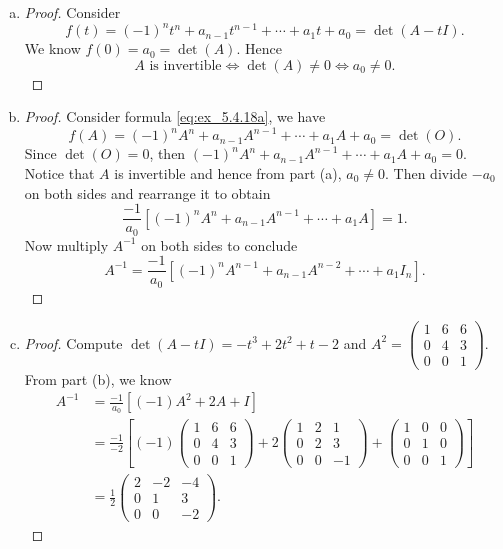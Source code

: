 \begin{Exercise}
	\begin{enumerate}[(a)]
		\item
		\begin{proof}
			Consider
			\begin{equation}\label{eq:ex_5.4.18a}
			f(t) = (-1)^n t^n + a_{n-1} t^{n-1} + \cdots + a_1 t + a_0 = \det(A-t I).
			\end{equation}
			We know $f(0) = a_0 = \det(A)$. Hence
			$$
			A\text{ is invertible} \iff \det(A)\neq 0 \iff a_0 \neq 0.
			$$
		\end{proof}
		
		\item
		\begin{proof}
			Consider formula \eqref{eq:ex_5.4.18a}, we have
			$$
			f(A) = (-1)^n A^n + a_{n-1} A^{n-1} + \cdots + a_1 A + a_0 = \det(O).
			$$
			Since $\det(O) = 0$, then $(-1)^n A^n + a_{n-1} A^{n-1} + \cdots + a_1 A + a_0 = 0$. Notice that $A$ is invertible and hence from part (a), $a_0\neq 0$. Then divide $-a_0$ on both sides and rearrange it to obtain
			$$
			\frac{-1}{a_0}\left[ (-1)^n A^n + a_{n-1} A^{n-1} + \cdots + a_1 A \right] = 1.
			$$
			Now multiply $A^{-1}$ on both sides to conclude
			$$
			A^{-1} = \frac{-1}{a_0}\left[ (-1)^n A^{n-1} + a_{n-1} A^{n-2} + \cdots + a_1 I_n \right].
			$$
		\end{proof}
		
		\item
		\begin{proof}
			Compute $\det(A-t I) = -t^3+2 t^2+t-2$ and $A^2 = \begin{pmatrix}
			1 & 6 & 6 \\
			0 & 4 & 3 \\
			0 & 0 & 1
			\end{pmatrix}$.
			From part (b), we know
			\begin{align*}
			A^{-1} 
			&= \frac{-1}{a_0}\left[ (-1)A^2 + 2A + I \right] \\
			&= \frac{-1}{-2} \left[ (-1)\begin{pmatrix}
			1 & 6 & 6 \\
			0 & 4 & 3 \\
			0 & 0 & 1
			\end{pmatrix} + 2\begin{pmatrix}
			1 & 2 & 1 \\
			0 & 2 & 3 \\
			0 & 0 & -1
			\end{pmatrix} + \begin{pmatrix}
			1 & 0 & 0 \\
			0 & 1 & 0 \\
			0 & 0 & 1
			\end{pmatrix} \right] \\
			&= \frac{1}{2}\begin{pmatrix}
			2 & -2 & -4 \\
			0 & 1 & 3 \\
			0 & 0 & -2
			\end{pmatrix}.
			\end{align*}
		\end{proof}
	\end{enumerate}
\end{Exercise}